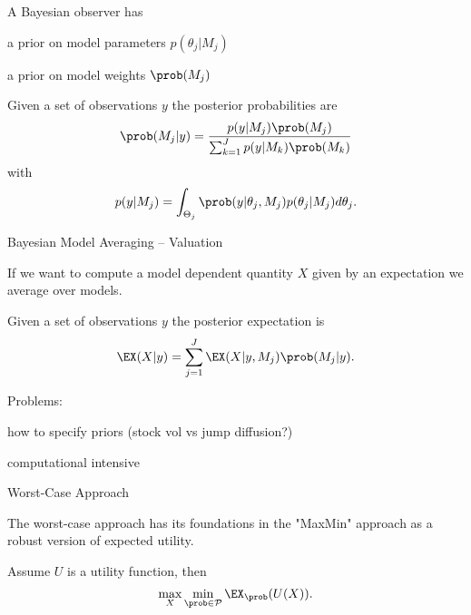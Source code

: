 	A Bayesian observer has






	a prior on model parameters $p(\theta_j|M_j)$

	a prior on model weights $\prob(M_j)$






	Given a set of observations $y$ the posterior probabilities are
$$
\prob(M_j|y) = \frac{p(y|M_j)\prob(M_j)}{\sum_{k=1}^{J}p(y|M_k)\prob(M_k)}
$$
with
$$
p(y|M_j)=\int_{\Theta_j} \prob(y|\theta_j, M_j)p(\theta_j|M_j) d\theta_j.
$$






{Bayesian Model Averaging -- Valuation}






	If we want to compute a model dependent quantity $X$ given by an expectation we average over models.

	Given a set of observations $y$ the posterior expectation is
$$
\EX(X|y) = \sum_{j=1}^{J} \EX(X |y, M_j) \prob(M_j |y).
$$

	Problems:






	how to specify priors (stock vol vs jump diffusion?)

	computational intensive











{Worst-Case Approach}






	The worst-case approach has its foundations in the "MaxMin" approach as a robust version of expected utility.

	 Assume $U$ is a utility function, then
$$
\max _X \min_{\prob \in {\cal P}} \EX_{\prob}(U(X)).
$$

